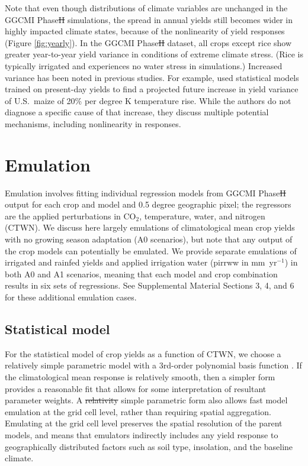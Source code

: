 \documentclass[gmdd]{copernicus} %
\providecommand{\DIFadd}[1]{{\protect\color{blue}\uwave{#1}}} %
\providecommand{\DIFdel}[1]{{\protect\color{red}\sout{#1}}}                      %
\providecommand{\DIFaddbegin}{} %
\providecommand{\DIFaddend}{} %
\providecommand{\DIFdelbegin}{} %
\providecommand{\DIFdelend}{} %
\begin{document}
Note that even though distributions of climate variables are unchanged in the GGCMI Phase\DIFdelbegin \DIFdel{II }\DIFdelend \DIFaddbegin \DIFadd{~2 }\DIFaddend simulations, the spread in annual yields still becomes wider in highly impacted climate states, because of the nonlinearity of yield responses (Figure \ref{fig:yearly}). 
In the GGCMI Phase\DIFdelbegin \DIFdel{II }\DIFdelend \DIFaddbegin \DIFadd{~2 }\DIFaddend dataset, all crops except rice show  greater year-to-year yield variance in conditions of extreme climate stress.
(Rice is typically irrigated and experiences no water stress in simulations.) 
Increased variance has been noted in previous studies. 
For example, \citet{Urban2012} used statistical models trained on present-day yields to find a projected future increase in yield variance of U.S.\ maize of 20\% per degree K temperature rise. While the authors do not diagnose a specific cause of that increase, they discuss multiple potential mechanisms, including nonlinearity in responses. 

\section{Emulation}
\label{S:3}
Emulation involves fitting individual regression models from GGCMI Phase\DIFdelbegin \DIFdel{II }\DIFdelend \DIFaddbegin \DIFadd{~2 }\DIFaddend output for each crop and model and 0.5 degree geographic pixel; the regressors are the applied perturbations in CO$_2$, temperature, water, and nitrogen (CTWN). 
We discuss here largely emulations of climatological mean crop yields with no growing season adaptation (A0 scenarios), but note that any output of the crop models can potentially be emulated. 
We provide separate emulations of irrigated and rainfed yields and applied irrigation water (pirrww in mm\ yr$^{-1}$) in both A0 and A1 scenarios, meaning that each model and crop combination results in six sets of regressions. See Supplemental Material Sections 3, 4, and 6 for these additional emulation cases.

\subsection{Statistical model}
For the statistical model of crop yields as a function of CTWN, we choose a relatively simple parametric model with a 3rd-order polynomial basis function \DIFaddbegin \DIFadd{(Equation \ref{eqn:features_original})}\DIFaddend .
If the climatological mean response is relatively smooth, then a simpler form provides a reasonable fit that allows for some interpretation of resultant parameter weights. 
A \DIFdelbegin \DIFdel{relativity }\DIFdelend \DIFaddbegin \DIFadd{relatively }\DIFaddend simple parametric form also allows fast model emulation at the grid cell level, rather than requiring spatial aggregation. 
Emulating at the grid cell level preserves the spatial resolution of the parent models, and means that emulators indirectly includes any yield response to geographically distributed factors such as soil type, insolation, and the baseline climate.
\end{document}
